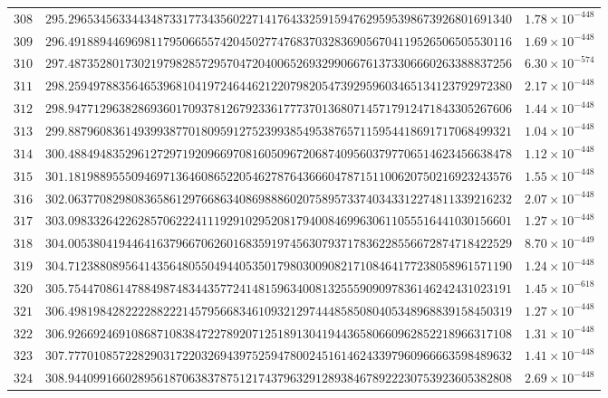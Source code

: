 \documentclass[12pt,reqno]{amsart}
\theoremstyle{remark}
\begin{document}
\begin{longtable}{clc}
$308$ & $295.2965345633443487331773435602271417643325915947629595398673926801691340$ & $1.78\times 10^{-448}$ \\
$309$ & $296.4918894469698117950665574204502774768370328369056704119526506505530116$ & $1.69\times 10^{-448}$ \\
$310$ & $297.4873528017302197982857295704720400652693299066761373306660263388837256$ & $6.30\times 10^{-574}$ \\
$311$ & $298.2594978835646539681041972464462122079820547392959603465134123792972380$ & $2.17\times 10^{-448}$ \\
$312$ & $298.9477129638286936017093781267923361777370136807145717912471843305267606$ & $1.44\times 10^{-448}$ \\
$313$ & $299.8879608361493993877018095912752399385495387657115954418691717068499321$ & $1.04\times 10^{-448}$ \\
$314$ & $300.4884948352961272971920966970816050967206874095603797706514623456638478$ & $1.12\times 10^{-448}$ \\
$315$ & $301.1819889555094697136460865220546278764366604787151100620750216923243576$ & $1.55\times 10^{-448}$ \\
$316$ & $302.0637708298083658612976686340869888602075895733740343312274811339216232$ & $2.07\times 10^{-448}$ \\
$317$ & $303.0983326422628570622241119291029520817940084699630611055516441030156601$ & $1.27\times 10^{-448}$ \\
$318$ & $304.0053804194464163796670626016835919745630793717836228556672874718422529$ & $8.70\times 10^{-449}$ \\
$319$ & $304.7123880895641435648055049440535017980300908217108464177238058961571190$ & $1.24\times 10^{-448}$ \\
$320$ & $305.7544708614788498748344357724148159634008132555909097836146242431023191$ & $1.45\times 10^{-618}$ \\
$321$ & $306.4981984282222882221457956683461093212974448585080405348968839158450319$ & $1.27\times 10^{-448}$ \\
$322$ & $306.9266924691086871083847227892071251891304194436580660962852218966317108$ & $1.31\times 10^{-448}$ \\
$323$ & $307.7770108572282903172203269439752594780024516146243397960966663598489632$ & $1.41\times 10^{-448}$ \\
$324$ & $308.9440991660289561870638378751217437963291289384678922230753923605382808$ & $2.69\times 10^{-448}$ \\

\end{longtable}
\end{document}
